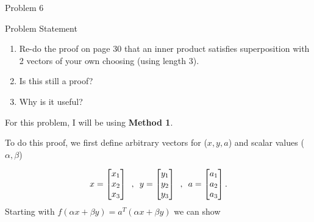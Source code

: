 \begin{problem}{Problem 6}
    \begin{statement}{Problem Statement}
        \begin{enumerate}[label=(\alph*)]
            \item Re-do the proof on page 30 that an inner product satisfies superposition with 2 vectors of your own choosing (using length 3).
            \item Is this still a proof?
            \item Why is it useful?
        \end{enumerate}
    \end{statement}

    \begin{highlight}
        For this problem, I will be using \textbf{Method 1}. \vspace*{1em}

        To do this proof, we first define arbitrary vectors for ($x,y,a$) and scalar values ($\alpha,\beta$)

        \setcounter{equation}{0}
        \begin{equation}
            x =
            \begin{bmatrix}
                x_{1} \\
                x_{2} \\
                x_{3} \\
            \end{bmatrix}
            \hspace*{5pt} , \hspace*{5pt}
            y = 
            \begin{bmatrix}
                y_{1} \\
                y_{2} \\
                y_{3} \\
            \end{bmatrix}
            \hspace*{5pt} , \hspace*{5pt}
            a = 
            \begin{bmatrix}
                a_{1} \\
                a_{2} \\
                a_{3} \\
            \end{bmatrix}.
        \end{equation}
        Starting with $f(\alpha x + \beta y) = a^{T}(\alpha x + \beta y)$ we can show
        

\end{highlight}
\end{problem}
